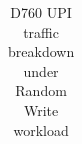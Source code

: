 \begin{table}[t]
\begin{tabular}{|l|cc|cc|cc||cc|cc|cc|}
\end{tabular}

\caption{D760 UPI traffic breakdown under Random Write workload}
\label{tab:upi-traffic}
\end{table}
